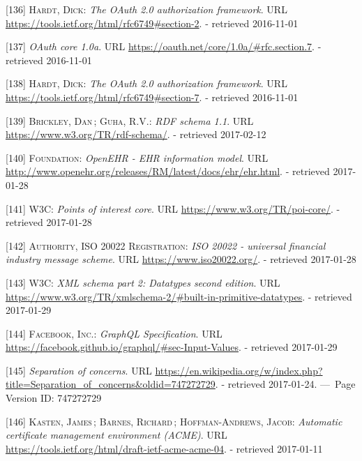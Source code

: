 \documentclass[12pt,english,a4paper,titlepage,cleardoublepage=empty,dottedtoc]{report}
\begin{document}
\hypertarget{ref-web_spec_oauth-2_client-reg}{}
{[}136{]} \textsc{Hardt, Dick}: \emph{The OAuth 2.0 authorization
framework}. URL \url{https://tools.ietf.org/html/rfc6749\#section-2}. -
retrieved 2016-11-01

\hypertarget{ref-web_spec_oauth-1a_access-verification}{}
{[}137{]} \emph{OAuth core 1.0a}. URL
\url{https://oauth.net/core/1.0a/\#rfc.section.7}. - retrieved
2016-11-01

\hypertarget{ref-web_spec_oauth-2_access-verification}{}
{[}138{]} \textsc{Hardt, Dick}: \emph{The OAuth 2.0 authorization
framework}. URL \url{https://tools.ietf.org/html/rfc6749\#section-7}. -
retrieved 2016-11-01

\hypertarget{ref-web_w3c-tr_rdf-schemas}{}
{[}139{]} \textsc{Brickley, Dan}\,; \textsc{Guha, R.V.}: \emph{RDF
schema 1.1}. URL \url{https://www.w3.org/TR/rdf-schema/}. - retrieved
2017-02-12

\hypertarget{ref-web_spec_data-schemas_ehr}{}
{[}140{]} \textsc{Foundation}: \emph{OpenEHR - EHR information model}.
URL \url{http://www.openehr.org/releases/RM/latest/docs/ehr/ehr.html}. -
retrieved 2017-01-28

\hypertarget{ref-web_spec_data-schemas_poi}{}
{[}141{]} \textsc{W3C}: \emph{Points of interest core}. URL
\url{https://www.w3.org/TR/poi-core/}. - retrieved 2017-01-28

\hypertarget{ref-web_spec_data-schemas_bank-transfer}{}
{[}142{]} \textsc{Authority, ISO 20022 Registration}: \emph{ISO 20022 -
universal financial industry message scheme}. URL
\url{https://www.iso20022.org/}. - retrieved 2017-01-28

\hypertarget{ref-web_spec_xml_types}{}
{[}143{]} \textsc{W3C}: \emph{XML schema part 2: Datatypes second
edition}. URL
\url{https://www.w3.org/TR/xmlschema-2/\#built-in-primitive-datatypes}.
- retrieved 2017-01-29

\hypertarget{ref-web_spec_graphql_types}{}
{[}144{]} \textsc{Facebook, Inc.}: \emph{GraphQL Specification}. URL
\url{https://facebook.github.io/graphql/\#sec-Input-Values}. - retrieved
2017-01-29

\hypertarget{ref-web_2016_wikipedia_separation-of-concerns}{}
{[}145{]} \emph{Separation of concerns}. URL
\url{https://en.wikipedia.org/w/index.php?title=Separation_of_concerns\&oldid=747272729}.
- retrieved 2017-01-24. ---~Page Version ID: 747272729

\hypertarget{ref-web_spec_acme}{}
{[}146{]} \textsc{Kasten, James}\,; \textsc{Barnes, Richard}\,;
\textsc{Hoffman-Andrews, Jacob}: \emph{Automatic certificate management
environment (ACME)}. URL
\url{https://tools.ietf.org/html/draft-ietf-acme-acme-04}. - retrieved
2017-01-11
\end{document}
